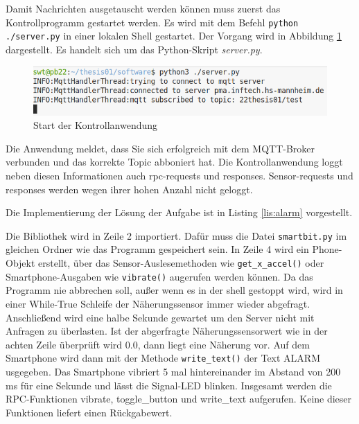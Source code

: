 \documentclass[11pt,a4paper]{report}
\begin{document}
Damit Nachrichten ausgetauscht werden können muss zuerst das Kontrollprogramm gestartet werden.
Es wird mit dem Befehl \texttt{python ./server.py} in einer lokalen Shell gestartet.
Der Vorgang wird in Abbildung \ref{fig:start_controll_app} dargestellt.
Es handelt sich um das Python-Skript \textit{server.py}.
\begin{figure}[htbp]
  \centering
  \includegraphics[width=.8\textwidth]{images/server_logging}
  \caption{Start der Kontrollanwendung}
  \label{fig:start_controll_app}
\end{figure}
Die Anwendung meldet, dass Sie sich erfolgreich mit dem MQTT-Broker verbunden und das korrekte Topic abboniert hat.
Die Kontrollanwendung loggt neben diesen Informationen auch rpc-requests und responses.
Sensor-requests und responses werden wegen ihrer hohen Anzahl nicht geloggt.

Die Implementierung der Lösung der Aufgabe ist in Listing \ref{lis:alarm} vorgestellt.

\lstset{language=python, captionpos=b, frame=single, numberstyle=\tiny, style=customcs}

Die Bibliothek wird in Zeile 2 importiert.
Dafür muss die Datei \texttt{smartbit.py} im gleichen Ordner wie das Programm gespeichert sein.
In Zeile 4 wird ein Phone-Objekt erstellt, über das Sensor-Auslesemethoden wie \texttt{get\_x\_accel()} oder Smartphone-Ausgaben wie \texttt{vibrate()} augerufen werden können.
Da das Programm nie abbrechen soll, außer wenn es in der shell gestoppt wird, wird in einer While-True Schleife der Näherungssensor immer wieder abgefragt.
Anschließend wird eine halbe Sekunde gewartet um den Server nicht mit Anfragen zu überlasten.
Ist der abgerfragte Näherungssensorwert wie in der achten Zeile überprüft wird 0.0, dann liegt eine Näherung vor.
Auf dem Smartphone wird dann mit der  Methode \texttt{write\_text()} der Text ALARM usgegeben.
Das Smartphone vibriert 5 mal hintereinander im Abstand von 200 ms für eine Sekunde und lässt die Signal-LED blinken.
Insgesamt werden die RPC-Funktionen vibrate, toggle\_button und write\_text aufgerufen.
Keine dieser Funktionen liefert einen Rückgabewert.
\end{document}

